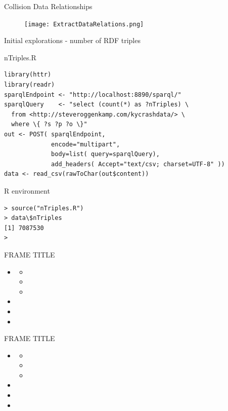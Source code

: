 \documentclass[t]{beamer}
\begin{document}
\begin{frame}{Collision Data Relationships}
  \begin{figure}
    \texttt{[image: ExtractDataRelations.png]}
  \end{figure}
\end{frame}


\begin{frame}[fragile]{Initial explorations - number of RDF triples}
  \begin{block}{nTriples.R}
    \begin{verbatim}
library(httr)
library(readr)
sparqlEndpoint <- "http://localhost:8890/sparql/"
sparqlQuery    <- "select (count(*) as ?nTriples) \
  from <http://steveroggenkamp.com/kycrashdata/> \
  where \{ ?s ?p ?o \}" 
out <- POST( sparqlEndpoint, 
             encode="multipart",
             body=list( query=sparqlQuery),
             add_headers( Accept="text/csv; charset=UTF-8" ))
data <- read_csv(rawToChar(out$content))
    \end{verbatim}
 \end{block}
 \begin{block}{R environment}
   \begin{verbatim}
> source("nTriples.R")
> data\$nTriples
[1] 7087530
> 
  \end{verbatim}
  \end{block}
\end{frame}

\begin{frame}{FRAME TITLE}
  \begin{itemize}
  \item 
    \begin{itemize}
      \item 
      \item 
      \item 
    \end{itemize}
  \item 
  \item 
  \item 
  \end{itemize}
  \note{}
\end{frame}

\begin{frame}{FRAME TITLE}
  \begin{itemize}
  \item 
    \begin{itemize}
      \item 
      \item 
      \item 
    \end{itemize}
  \item 
  \item 
  \item 
  \end{itemize}
  \note{}
\end{frame}
\end{document}
